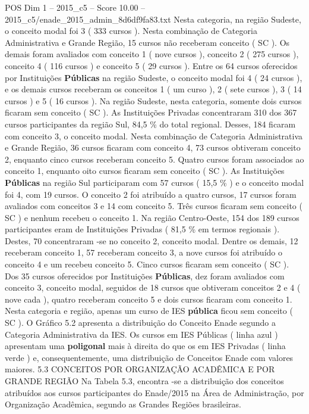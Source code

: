 \begin{textsample}{POS Dim 1 – 2015\_c5 – Score 10.00 – 2015\_c5/enade\_2015\_admin\_8d6df9fa83.txt}
Nesta categoria, na região Sudeste, o conceito modal foi 3 ( 333 cursos ).
Nesta combinação de Categoria Administrativa e Grande Região, 15 cursos não receberam conceito ( SC ).
Os demais foram avaliados com conceito 1 ( nove cursos ), conceito 2 ( 275 cursos ), conceito 4 ( 116 cursos ) e conceito 5 ( 29 cursos ).
Entre os 64 cursos oferecidos por Instituições \textbf{Públicas} na região Sudeste, o conceito modal foi 4 ( 24 cursos ), e os demais cursos receberam os conceitos 1 ( um curso ), 2 ( sete cursos ), 3 ( 14 cursos ) e 5 ( 16 cursos ).
Na região Sudeste, nesta categoria, somente dois cursos ficaram sem conceito ( SC ).
As Instituições Privadas concentraram 310 dos 367 cursos participantes da região Sul, 84,5 \% do total regional.
Desses, 184 ficaram com conceito 3, o conceito modal.
Nesta combinação de Categoria Administrativa e Grande Região, 36 cursos ficaram com conceito 4, 73 cursos obtiveram conceito 2, enquanto cinco cursos receberam conceito 5.
Quatro cursos foram associados ao conceito 1, enquanto oito cursos ficaram sem conceito ( SC ).
As Instituições \textbf{Públicas} na região Sul participaram com 57 cursos ( 15,5 \% ) e o conceito modal foi 4, com 19 cursos.
O conceito 2 foi atribuído a quatro cursos, 17 cursos foram avaliados com conceitos 3 e 14 com conceito 5.
Três cursos ficaram sem conceito ( SC ) e nenhum recebeu o conceito 1.
Na região Centro-Oeste, 154 dos 189 cursos participantes eram de Instituições Privadas ( 81,5 \% em termos regionais ).
Destes, 70 concentraram -se no conceito 2, conceito modal.
Dentre os demais, 12 receberam conceito 1, 57 receberam conceito 3, a nove cursos foi atribuído o conceito 4 e um recebeu conceito 5.
Cinco cursos ficaram sem conceito ( SC ).
Dos 35 cursos oferecidos por Instituições \textbf{Públicas}, dez foram avaliados com conceito 3, conceito modal, seguidos de 18 cursos que obtiveram conceitos 2 e 4 ( nove cada ), quatro receberam conceito 5 e dois cursos ficaram com conceito 1.
Nesta categoria e região, apenas um curso de IES \textbf{pública} ficou sem conceito ( SC ).
O Gráfico 5.2 apresenta a distribuição do Conceito Enade segundo a Categoria Administrativa da IES.
Os cursos em IES Públicas ( linha azul ) apresentam uma \textbf{poligonal} mais à direita do que os em IES Privadas ( linha verde ) e, consequentemente, uma distribuição de Conceitos Enade com valores maiores. 5.3 CONCEITOS POR ORGANIZAÇÃO ACADÊMICA E POR GRANDE REGIÃO Na Tabela 5.3, encontra -se a distribuição dos conceitos atribuídos aos cursos participantes do Enade/2015 na Área de Administração, por Organização Acadêmica, segundo as Grandes Regiões brasileiras.

\end{textsample}
